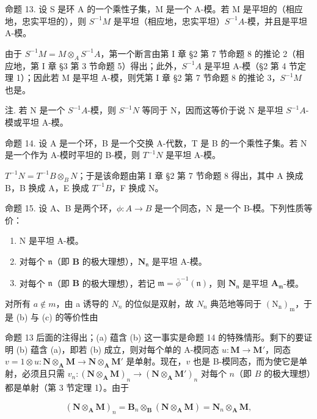命题 13. 设 S 是环 A 的一个乘性子集，M 是一个 A-模。若 M 是平坦的（相应地，忠实平坦的），则 \(S^{-1}M\) 是平坦（相应地，忠实平坦）\(S^{-1}A\)-模，并且是平坦 A-模。

由于 \(S^{-1}M = M \otimes_{A} S^{-1}A\)，第一个断言由第 I 章 §2 第 7 节命题 8 的推论 2（相应地，第 I 章 §3 第 3 节命题 5）得出；此外，\(S^{-1}A\) 是平坦 A-模（§2 第 4 节定理 1）；因此若 M 是平坦 A-模，则凭第 I 章 §2 第 7 节命题 8 的推论 3，\(S^{-1}M\) 也是。

注. 若 N 是一个 \(S^{-1}A\)-模，则 \(S^{-1}N\) 等同于 N，因而这等价于说 N 是平坦 \(S^{-1}A\)-模或平坦 A-模。

命题 14. 设 A 是一个环，B 是一个交换 A-代数，T 是 B 的一个乘性子集。若 N 是一个作为 A-模时平坦的 B-模，则 \(T^{-1}N\) 是平坦 A-模。

\(T^{-1}N = T^{-1}B \otimes_{B} N\)；于是该命题由第 I 章 §2 第 7 节命题 8 得出，其中 A 换成 B，B 换成 A，E 换成 \(T^{-1}B\)，F 换成 N。

命题 15. 设 A、B 是两个环，\(\phi: A \to B\) 是一个同态，N 是一个 B-模。下列性质等价：

\begin{enumerate}
\def\labelenumi{(\alph{enumi})}
\item
  N 是平坦 A-模。
\item
  对每个 \(\mathfrak{n}\)（即 \(\mathbf{B}\) 的极大理想），\(\mathbf{N}_{\mathfrak{n}}\) 是平坦 A-模。
\item
  对每个 \(\mathfrak{n}\)（即 \(\mathbf{B}\) 的极大理想），若记 \(\mathfrak{m} = \bar{\phi}^{-1}(\mathfrak{n})\)，则 \(\mathbf{N}_{\mathfrak{n}}\) 是平坦 \(\mathbf{A}_{\mathfrak{m}}\)-模。
\end{enumerate}

对所有 \(a \notin m\)，由 a 诱导的 \(N_{n}\) 的位似是双射，故 \(N_{n}\) 典范地等同于 \((\mathrm{N}_{\mathrm{n}})_{\mathrm{m}}\)，于是 (b) 与 (c) 的等价性由

命题 13 后面的注得出；(a) 蕴含 (b) 这一事实是命题 14 的特殊情形。剩下的要证明 (b) 蕴含 (a)，即若 (b) 成立，则对每个单的 A-模同态 \(u: \mathbf{M} \to \mathbf{M}'\)，同态 \(v = 1 \otimes u: \mathbf{N} \otimes_{\mathbf{A}} \mathbf{M} \to \mathbf{N} \otimes_{\mathbf{A}} \mathbf{M}'\) 是单射。现在，\(v\) 也是 B-模同态，而为使它是单射，必须且只需 \(v_n: (\mathbf{N} \otimes_{\mathbf{A}} \mathbf{M})_n \to (\mathbf{N} \otimes_{\mathbf{A}} \mathbf{M}')_n\) 对每个 \(n\)（即 \(B\) 的极大理想）都是单射（第 3 节定理 1）。由于

\[
(\mathbf {N} \otimes_ {\mathbf {A}} \mathbf {M}) _ {n} = \mathbf {B} _ {n} \otimes_ {\mathbf {B}} (\mathbf {N} \otimes_ {\mathbf {A}} \mathbf {M}) = \mathbf {N} _ {n} \otimes_ {\mathbf {A}} \mathbf {M},
\]

